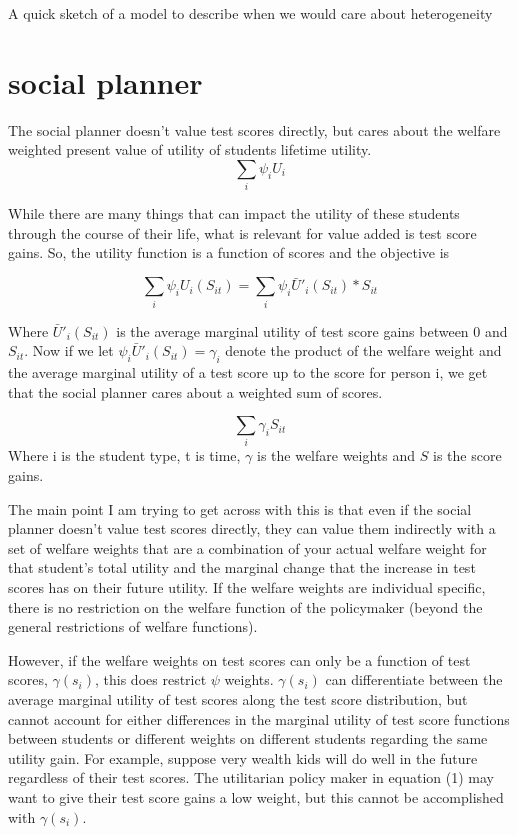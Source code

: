 \documentclass[letterpaper,12pt]{article}
\begin{document}
A quick sketch of a model to describe when we would care about heterogeneity 

\section{social planner}
The social planner doesn't value test scores directly, but cares about the welfare weighted present value of utility of students lifetime utility. 
\begin{equation}
 \sum_i \psi_i U_{i}
\end{equation}

While there are many things that can impact the utility of these students through the course of their life, what is relevant for value added is test score gains. So, the utility function is a function of scores and the objective is

\begin{equation}
 \sum_i \psi_i U_{i}(S_{it}) = \sum_i \psi_i \bar{U}'_{i}(S_{it}) * S_{it}
\end{equation}

Where $\bar{U}'_{i}(S_{it}) $ is the average marginal utility of test score gains between $0$ and $S_{it}$. Now if we let $\psi_i \bar{U}'_{i}(S_{it}) = \gamma_i$ denote the product of the welfare weight and the average marginal utility of a test score up to the score for person i, we get that the social planner cares about a weighted sum of scores. 

\begin{equation}
    \sum_i \gamma_i S_{it}
\end{equation}
Where i is the student type, t is time, $\gamma$ is the welfare weights and $S$ is the score gains. 

The main point I am trying to get across with this is that even if the social planner doesn't value test scores directly, they can value them indirectly with a set of welfare weights that are a combination of your actual welfare weight for that student's total utility and the marginal change that the increase in test scores has on their future utility. If the welfare weights are individual specific, there is no restriction on the welfare function of the policymaker (beyond the general restrictions of welfare functions).

However, if the welfare weights on test scores can only be a function of test scores, $\gamma(s_i)$, this does restrict $\psi$ weights. $\gamma(s_i)$ can differentiate between the average marginal utility of test scores along the test score distribution, but cannot account for either differences in the marginal utility of test score functions between students or different weights on different students regarding the same utility gain. For example, suppose very wealth kids will do well in the future regardless of their test scores. The utilitarian policy maker in equation (1) may want to give their test score gains a low weight, but this cannot be accomplished with $\gamma(s_i)$. 
\end{document}
